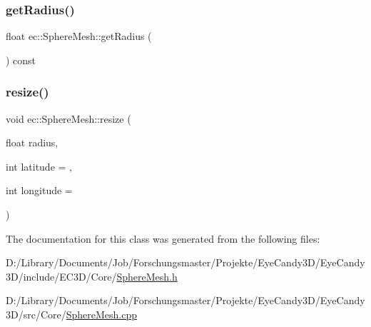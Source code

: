 \mbox{\label{classec_1_1_sphere_mesh_a4f994d66fe769ebeac0d9a560b5a9313}} 
\subsubsection{\texorpdfstring{get\+Radius()}{getRadius()}}
{\footnotesize\ttfamily float ec\+::\+Sphere\+Mesh\+::get\+Radius (\begin{DoxyParamCaption}{ }\end{DoxyParamCaption}) const}

\mbox{\label{classec_1_1_sphere_mesh_af3d2617313d7ed747408a75adcd32fc5}} 
\subsubsection{\texorpdfstring{resize()}{resize()}}
{\footnotesize\ttfamily void ec\+::\+Sphere\+Mesh\+::resize (\begin{DoxyParamCaption}\item[{float}]{radius,  }\item[{int}]{latitude = {},  }\item[{int}]{longitude = {} }\end{DoxyParamCaption})}



The documentation for this class was generated from the following files\+:\begin{DoxyCompactItemize}
\item 
D\+:/\+Library/\+Documents/\+Job/\+Forschungsmaster/\+Projekte/\+Eye\+Candy3\+D/\+Eye\+Candy3\+D/include/\+E\+C3\+D/\+Core/\mbox{\hyperlink{_sphere_mesh_8h}{Sphere\+Mesh.\+h}}\item 
D\+:/\+Library/\+Documents/\+Job/\+Forschungsmaster/\+Projekte/\+Eye\+Candy3\+D/\+Eye\+Candy3\+D/src/\+Core/\mbox{\hyperlink{_sphere_mesh_8cpp}{Sphere\+Mesh.\+cpp}}\end{DoxyCompactItemize}
